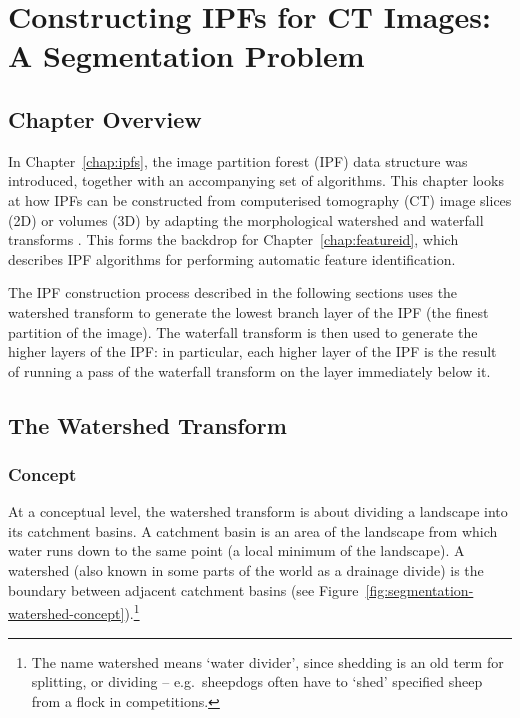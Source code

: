 \chapter[Constructing IPFs for CT Images: A Segmentation Problem]{Constructing IPFs for CT Images:\\A Segmentation Problem}
\label{chap:segmentation}

\section{Chapter Overview}

In Chapter~\ref{chap:ipfs}, the image partition forest (IPF) data structure was introduced, together with an accompanying set of algorithms. This chapter looks at how IPFs can be constructed from computerised tomography (CT) image slices (2D) or volumes (3D) by adapting the morphological watershed and waterfall transforms \cite{beucher94,marcotegui05}. This forms the backdrop for Chapter~\ref{chap:featureid}, which describes IPF algorithms for performing automatic feature identification.

The IPF construction process described in the following sections uses the watershed transform to generate the lowest branch layer of the IPF (the finest partition of the image). The waterfall transform is then used to generate the higher layers of the IPF: in particular, each higher layer of the IPF is the result of running a pass of the waterfall transform on the layer immediately below it.

\section{The Watershed Transform}

\subsection{Concept}

At a conceptual level, the watershed transform is about dividing a landscape into its catchment basins. A catchment basin is an area of the landscape from which water runs down to the same point (a local minimum of the landscape). A watershed (also known in some parts of the world as a drainage divide) is the boundary between adjacent catchment basins (see Figure~\ref{fig:segmentation-watershed-concept}).\footnote{The name watershed means `water divider', since shedding is an old term for splitting, or dividing -- e.g.~sheepdogs often have to `shed' specified sheep from a flock in competitions.}

